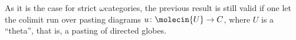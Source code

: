 \begin{rmk} \label{rmk:thetas_are_dense}
    As it is the case for strict \( \omega \)\nbd categories, the previous result is still valid if one let the colimit run over pasting diagrams \( u \colon \molecin{U} \to C \), where \( U \) is a ``theta'', that is, a pasting of directed globes.
\end{rmk}








